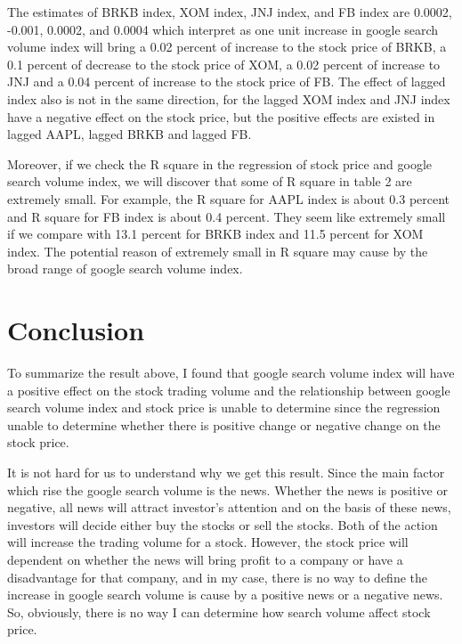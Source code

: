 \documentclass[12pt,english]{article}
\begin{document}
\newline
The estimates of BRKB index, XOM index, JNJ index, and FB index are 0.0002, -0.001, 0.0002, and 0.0004 which interpret as one unit increase in google search volume index will bring a 0.02 percent of increase to the stock price of BRKB, a 0.1 percent of decrease to the stock price of XOM, a 0.02 percent of increase to JNJ and a 0.04 percent of increase to the stock price of FB. The effect of lagged index also is not in the same direction, for the lagged XOM index and JNJ index have a negative effect on the stock price, but the positive effects are existed in lagged AAPL, lagged BRKB and lagged FB. 
\newline

\newline
Moreover, if we check the R square in the regression of stock price and google search volume index, we will discover that some of R square in table 2 are extremely small. For example, the R square for AAPL index is about 0.3 percent and R square for FB index is about 0.4 percent. They seem like extremely small if we compare with 13.1 percent for BRKB index and 11.5 percent for XOM index. The potential reason of extremely small in R square may cause by the broad range of google search volume index. 
\newline


\section{Conclusion}
To summarize the result above, I found that google search volume index will have a positive effect on the stock trading volume and the relationship between google search volume index and stock price is unable to determine since the regression unable to determine whether there is positive change or negative change on the stock price. 
\newline

\newline
It is not hard for us to understand why we get this result. Since the main factor which rise the google search volume is the news. Whether the news is positive or negative, all news will attract investor’s attention and on the basis of these news, investors will decide either buy the stocks or sell the stocks. Both of the action will increase the trading volume for a stock. However, the stock price will dependent on whether the news will bring profit to a company or have a disadvantage for that company, and in my case, there is no way to define the increase in google search volume is cause by a positive news or a negative news. So, obviously, there is no way I can determine how search volume affect stock price.
\newline
\end{document}
